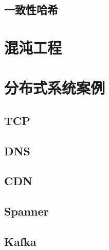 \documentclass[reqno,heading=true,fontset=macnew]{ctexbook}
\begin{document}
\section{一致性哈希}


\chapter{混沌工程}

\chapter{分布式系统案例}

\section{TCP}
\section{DNS}

\section{CDN}

\section{Spanner}

\section{Kafka}







{}



\printindex
\end{document}
